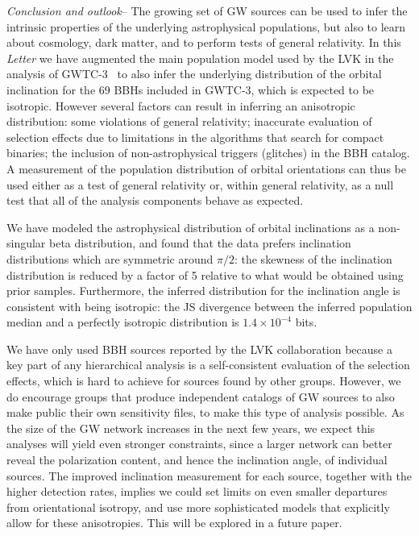 \documentclass[floats,floatfix,showpacs,amssymb,prl,twocolumn,superscriptaddress,nofootinbib]{revtex4-2}
\newcommand{\paper}{{\it Letter}\xspace}
\newcommand\prlsec[1]{\vspace{2mm}\noindent \emph{#1}--}
\newcommand{\catalog}{GWTC-3\xspace}
\begin{document}
\prlsec{Conclusion and outlook} The growing set of GW sources can be used to infer the intrinsic properties of the underlying astrophysical populations, but also to learn about cosmology, dark matter, and to perform tests of general relativity. In this \paper we have augmented the main population model used by the LVK in the analysis of \catalog~\cite{LIGOScientific:2021djp} to also infer the underlying distribution of the orbital inclination for the 69 BBHs included in \catalog, which is expected to be isotropic. However several factors can result in inferring an anisotropic distribution: some violations of general relativity; inaccurate evaluation of selection effects due to limitations in the algorithms that search for compact binaries; the inclusion of non-astrophysical triggers (glitches) in the BBH catalog. 
A measurement of the population distribution of orbital orientations can thus be used either as a test of general relativity or, within general relativity, as a null test that all of the analysis components behave as expected. 

We have modeled the astrophysical distribution of orbital inclinations as a non-singular beta distribution, and found that the data prefers inclination distributions which are symmetric around $\pi/2$: the skewness of the inclination distribution is reduced by a factor of 5 relative to what would be obtained using prior samples. Furthermore, the inferred distribution for the inclination angle is consistent with being isotropic: the JS divergence between the inferred population median and a perfectly isotropic distribution is $1.4\times 10^{-4}$ bits. 

We have only used BBH sources reported by the LVK collaboration because a key part of any hierarchical analysis is a self-consistent evaluation of the selection effects, which is hard to achieve for sources found by other groups. However, we do encourage groups that produce independent catalogs of GW sources to also make public their own sensitivity files, to make this type of analysis possible. 
As the size of the GW network increases in the next few years, we expect this analyses will yield even stronger constraints, since a larger network can better reveal the polarization content, and hence the inclination angle, of individual sources. The improved inclination measurement for each source, together with the higher detection rates, implies we could set limits on even smaller departures from orientational isotropy, and use more sophisticated models that explicitly allow for these anisotropies. This will be explored in a future paper.
\end{document}
